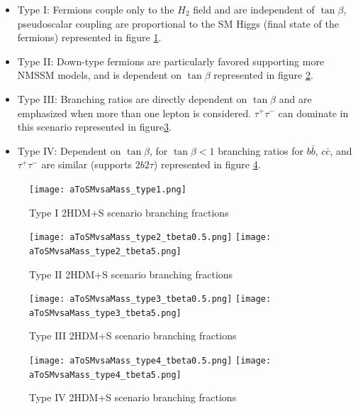 \begin{itemize}
\item Type I: Fermions couple only to the $H_2$ field and are independent of $\tan\beta$, pseudoscalar coupling are proportional to the SM Higgs (final state of the fermions) represented in figure \ref{fig:br2HDM-1}.
\item Type II: Down-type fermions are particularly favored supporting more NMSSM models, and is dependent on $\tan\beta$ represented in figure \ref{fig:br2HDM-2}. 
\item Type III: Branching ratios are directly dependent on $\tan\beta$ and are emphasized when more than one lepton is considered. $\tau^+ \tau^-$ can dominate in this scenario represented in figure\ref{fig:br2HDM-3}. 
\item Type IV: Dependent on $\tan\beta$, for $\tan \beta < 1 $ branching ratios for $b\bar{b}$, $c\bar{c}$, and $\tau^+ \tau^-$ are similar (supports $2b2\tau$) represented in figure \ref{fig:br2HDM-4}.
\end{itemize}


\begin{figure}[ht!b]
  \centering
\texttt{[image: aToSMvsaMass\_type1.png]}           \\
    \caption{\label{fig:br2HDM-1} Type I 2HDM+S scenario branching fractions}
\end{figure}

\begin{figure}[ht!b]
  \centering
\texttt{[image: aToSMvsaMass\_type2\_tbeta0.5.png]}
\texttt{[image: aToSMvsaMass\_type2\_tbeta5.png]}           \\
    \caption{\label{fig:br2HDM-2} Type II 2HDM+S scenario branching fractions}
\end{figure}

\begin{figure}[ht!b]
  \centering
\texttt{[image: aToSMvsaMass\_type3\_tbeta0.5.png]}
\texttt{[image: aToSMvsaMass\_type3\_tbeta5.png]}           \\
    \caption{\label{fig:br2HDM-3} Type III 2HDM+S scenario branching fractions}
\end{figure}



\begin{figure}[ht!b]
  \centering
\texttt{[image: aToSMvsaMass\_type4\_tbeta0.5.png]}
\texttt{[image: aToSMvsaMass\_type4\_tbeta5.png]}           \\
    \caption{\label{fig:br2HDM-4} Type IV 2HDM+S scenario branching fractions}
\end{figure}

